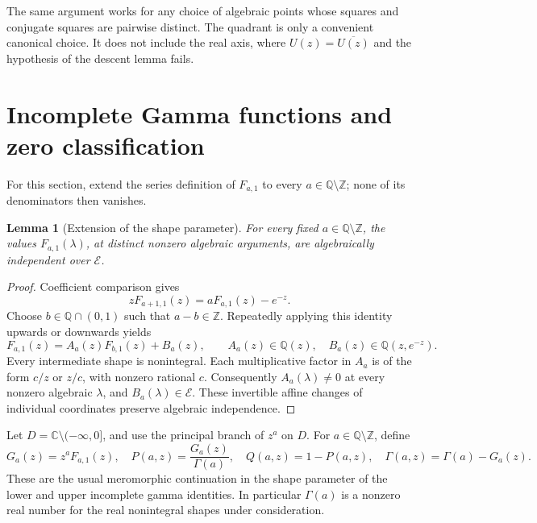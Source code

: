 \documentclass[11pt,a4paper]{article}
\newcommand{\E}{\mathcal E}
\newtheorem{lemma}[theorem]{Lemma}
\theoremstyle{definition}
\theoremstyle{remark}
\numberwithin{equation}{section}
\begin{document}
The same argument works for any choice of algebraic points whose
squares and conjugate squares are pairwise distinct.  The quadrant is
only a convenient canonical choice.  It does not include the real
axis, where $U(z)=\overline{U(z)}$ and the hypothesis of the descent
lemma fails.


\section{Incomplete Gamma functions and zero classification}
For this section, extend the series definition of $F_{a,1}$ to every
$a\in\mathbb Q\setminus\mathbb Z$; none of its denominators then vanishes.
\begin{lemma}[Extension of the shape parameter]\label{norm:lem:shape-extension}
For every fixed \(a\in\mathbb Q\setminus\mathbb Z\), the values
\(F_{a,1}(\lambda)\), at distinct nonzero algebraic arguments, are algebraically
independent over \(\E\).
\end{lemma}
\begin{proof}
Coefficient comparison gives
\[
 zF_{a+1,1}(z)=aF_{a,1}(z)-e^{-z}.
\]
Choose \(b\in\mathbb Q\cap(0,1)\) such that \(a-b\in\mathbb Z\).
Repeatedly applying this identity upwards or downwards yields
\[
 F_{a,1}(z)=A_a(z)F_{b,1}(z)+B_a(z),
 \qquad A_a(z)\in\mathbb Q(z),\quad
 B_a(z)\in\mathbb Q(z,e^{-z}).
\]
Every intermediate shape is nonintegral.  Each multiplicative factor in
\(A_a\) is of the form \(c/z\) or \(z/c\), with nonzero rational \(c\).
Consequently \(A_a(\lambda)\ne0\) at every nonzero algebraic \(\lambda\),
and \(B_a(\lambda)\in\E\).  These invertible affine changes of
individual coordinates preserve algebraic independence.
\end{proof}

Let \(D=\mathbb C\setminus(-\infty,0]\), and use the principal branch of
\(z^a\) on \(D\). For \(a\in\mathbb Q\setminus\mathbb Z\), define
\[
 G_a(z)=z^aF_{a,1}(z),\quad
 P(a,z)=\frac{G_a(z)}{\Gamma(a)},\quad
 Q(a,z)=1-P(a,z),\quad
 \Gamma(a,z)=\Gamma(a)-G_a(z).
\]
These are the usual meromorphic continuation in the shape parameter of
the lower and upper incomplete gamma identities.  In particular
\(\Gamma(a)\) is a nonzero real number for the real nonintegral shapes
under consideration.
\end{document}
